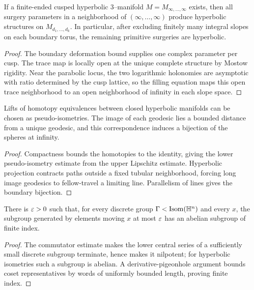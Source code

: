 \begin{theorem}
\label{thurston-ch05-hyperbolic-dehn-surgery}
If a finite-ended cusped hyperbolic $3$--manifold $M=M_{\infty,\ldots,\infty}$ exists, then all surgery parameters in a neighborhood of $(\infty,\ldots,\infty)$ produce hyperbolic structures on $M_{d_1,\ldots,d_k}$.  In particular, after excluding finitely many integral slopes on each boundary torus, the remaining primitive surgeries are hyperbolic.
\end{theorem}
\begin{proof}\sketch The boundary deformation bound supplies one complex parameter per cusp.  The trace map is locally open at the unique complete structure by Mostow rigidity.  Near the parabolic locus, the two logarithmic holonomies are asymptotic with ratio determined by the cusp lattice, so the filling equation maps this open trace neighborhood to an open neighborhood of infinity in each slope space.\end{proof}

\begin{lemma}
\label{thurston-ch05-pseudo-isometric-geodesics}
Lifts of homotopy equivalences between closed hyperbolic manifolds can be chosen as pseudo-isometries.  The image of each geodesic lies a bounded distance from a unique geodesic, and this correspondence induces a bijection of the spheres at infinity.
\end{lemma}
\begin{proof}\sketch Compactness bounds the homotopies to the identity, giving the lower pseudo-isometry estimate from the upper Lipschitz estimate.  Hyperbolic projection contracts paths outside a fixed tubular neighborhood, forcing long image geodesics to fellow-travel a limiting line.  Parallelism of lines gives the boundary bijection.\end{proof}

\begin{proposition}
\label{thurston-ch05-thick-thin-abelian-subgroup}
There is $\varepsilon>0$ such that, for every discrete group $\Gamma<\operatorname{Isom}(\mathbb{H}^n)$ and every $x$, the subgroup generated by elements moving $x$ at most $\varepsilon$ has an abelian subgroup of finite index.
\end{proposition}
\begin{proof}\sketch The commutator estimate makes the lower central series of a sufficiently small discrete subgroup terminate, hence makes it nilpotent; for hyperbolic isometries such a subgroup is abelian.  A derivative-pigeonhole argument bounds coset representatives by words of uniformly bounded length, proving finite index.\end{proof}

